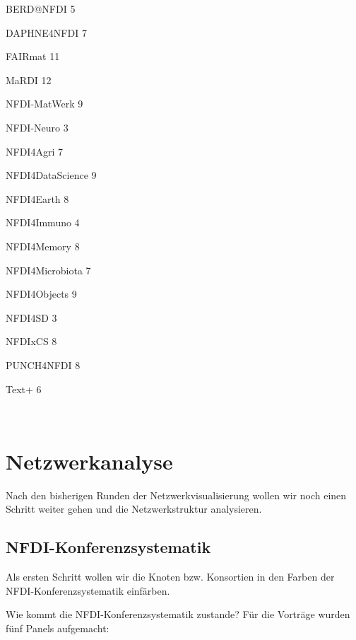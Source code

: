 \documentclass[11pt]{article}
\begin{document}
    \begin{description*}
\item[BERD@NFDI] 5
\item[DAPHNE4NFDI] 7
\item[FAIRmat] 11
\item[MaRDI] 12
\item[NFDI-MatWerk] 9
\item[NFDI-Neuro] 3
\item[NFDI4Agri] 7
\item[NFDI4DataScience] 9
\item[NFDI4Earth] 8
\item[NFDI4Immuno] 4
\item[NFDI4Memory] 8
\item[NFDI4Microbiota] 7
\item[NFDI4Objects] 9
\item[NFDI4SD] 3
\item[NFDIxCS] 8
\item[PUNCH4NFDI] 8
\item[Text+] 6
\end{description*}


    
    \begin{center}
    \end{center}
    { \hspace*{\fill} \\}
    
    \hypertarget{netzwerkanalyse}{%
\section{Netzwerkanalyse}\label{netzwerkanalyse}}

Nach den bisherigen Runden der Netzwerkvisualisierung wollen wir noch
einen Schritt weiter gehen und die Netzwerkstruktur analysieren.

\hypertarget{nfdi-konferenzsystematik}{%
\subsection{NFDI-Konferenzsystematik}\label{nfdi-konferenzsystematik}}

Als ersten Schritt wollen wir die Knoten bzw. Konsortien in den Farben
der NFDI-Konferenzsystematik einfärben.

Wie kommt die NFDI-Konferenzsystematik zustande? Für die Vorträge wurden
fünf Panels aufgemacht:
\end{document}
